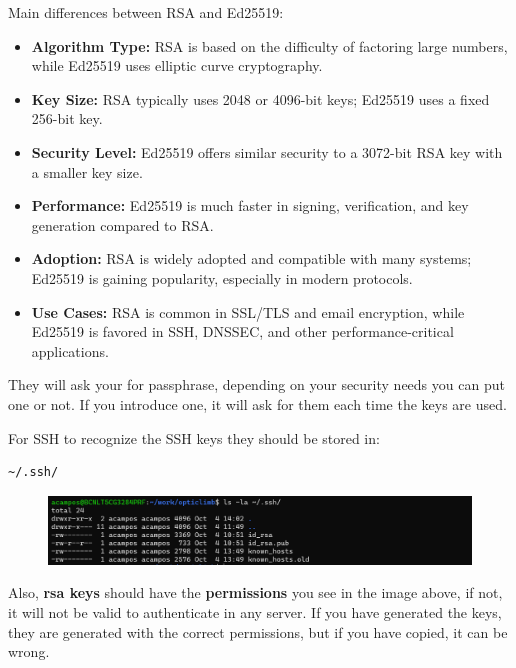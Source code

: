 \documentclass{article}
\newenvironment{blocktemplateI}[1]{%
    \tcolorbox[beamer,%
    noparskip,breakable,
    colframe=Violet,%
    colbacklower=Black,%
    title=#1]}%
    {\endtcolorbox}
\newenvironment{blocktemplateIII}[1]{%
    \tcolorbox[beamer,%
    noparskip,breakable,
    ,colframe=Red,%
    colbacklower=LimeGreen!75!LightGreen,%
    title=#1]}%
    {\endtcolorbox}
\newenvironment{codetemplate}[1][]{%
  \mybasecolorbox[#1]
  \itshape
}{%
  \endmybasecolorbox
}
\begin{document}
\begin{blocktemplateI}{Note}
Main differences between RSA and Ed25519:
\begin{itemize}
    \item \textbf{Algorithm Type:} RSA is based on the difficulty of factoring large numbers, while Ed25519 uses elliptic curve cryptography.
    \item \textbf{Key Size:} RSA typically uses 2048 or 4096-bit keys; Ed25519 uses a fixed 256-bit key.
    \item \textbf{Security Level:} Ed25519 offers similar security to a 3072-bit RSA key with a smaller key size.
    \item \textbf{Performance:} Ed25519 is much faster in signing, verification, and key generation compared to RSA.
    \item \textbf{Adoption:} RSA is widely adopted and compatible with many systems; Ed25519 is gaining popularity, especially in modern protocols.
    \item \textbf{Use Cases:} RSA is common in SSL/TLS and email encryption, while Ed25519 is favored in SSH, DNSSEC, and other performance-critical applications.
\end{itemize}
\end{blocktemplateI}

They will ask your for passphrase, depending on your security needs you can put one or not. If you introduce one, it will ask for them each time the keys are used.

\begin{blocktemplateIII}{WARNING}
For SSH to recognize the SSH keys they should be stored in:
\begin{codetemplate}{}
\begin{verbatim}
~/.ssh/
\end{verbatim}
\end{codetemplate}
\begin{figure}[H]
    \includegraphics[width=\textwidth]{pictures/ssh2.png}
    \centering
\end{figure}
Also, \textbf{rsa keys} should have the \textbf{permissions} you see in the image above, if not, it will not be valid to authenticate in any server. If you have generated the keys, they are generated with the correct permissions, but if you have copied, it can be wrong.
\end{blocktemplateIII}
\end{document}
